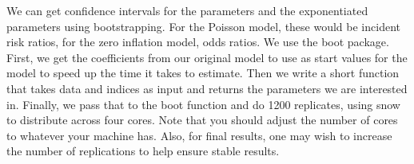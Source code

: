 \documentclass[MASTER.tex]{subfiles}
\begin{document}
\begin{frame}[fragile]
We can get confidence intervals for the parameters and the exponentiated parameters using bootstrapping. For the Poisson model, these would be incident risk ratios, for the zero inflation model, odds ratios. We use the boot package. First, we get the coefficients from our original model to use as start values for the model to speed up the time it takes to estimate. Then we write a short function that takes data and indices as input and returns the parameters we are interested in. Finally, we pass that to the boot function and do 1200 replicates, using snow to distribute across four cores. Note that you should adjust the number of cores to whatever your machine has. Also, for final results, one may wish to increase the number of replications to help ensure stable results.
\end{frame}
\end{document}
